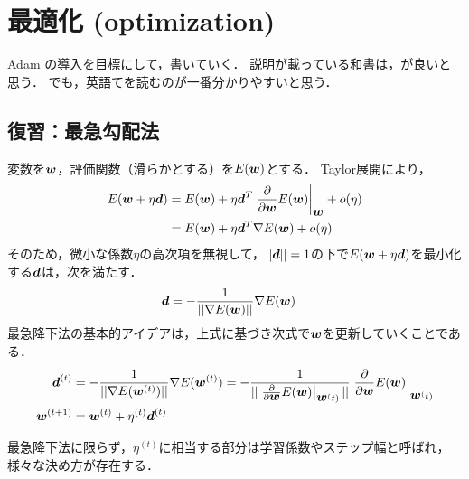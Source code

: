 \section{最適化 (optimization)}
Adam \cite{kingma2015adam}の導入を目標にして，書いていく．
説明が載っている和書は，\cite{harada2017image}が良いと思う．
でも，英語て\cite{ruder2016overview}を読むのが一番分かりやすいと思う．


\subsection{復習：最急勾配法}
変数を$\vw$，評価関数（滑らかとする）を$E(\vw)$とする．
Taylor展開により，
\begin{align*}
 E(\vw+\eta\vd)
 &=
 E(\vw) + \eta\vd^T\left.\frac{\partial}{\partial \vw}E(\vw)\right|_{\vw} + o(\eta)
 \\
 &=
 E(\vw) + \eta\vd^T \nabla E(\vw) + o(\eta)
\end{align*}
そのため，微小な係数$\eta$の高次項を無視して，$||\vd||=1$の下で$E(\vw+\eta\vd)$を最小化する$\vd$は，次を満たす．
\begin{align*}
  \vd &= -\frac{1}{||\nabla E(\vw)||} \nabla E(\vw)
\end{align*}
最急降下法の基本的アイデアは，上式に基づき次式で$\vw$を更新していくことである．
\begin{align*}
  \vd^{(t)} &= -\frac{1}{||\nabla E(\vw^{(t)})||} \nabla E(\vw^{(t)})
  =
  -\frac{1}{||\left.\frac{\partial}{\partial \vw}E(\vw)\right|_{\vw^(t)}||} \left.\frac{\partial}{\partial \vw}E(\vw)\right|_{\vw^(t)}
  \\
  \vw^{(t+1)} &= \vw^{(t)} + \eta^{(t)} \vd^{(t)}
\end{align*}

最急降下法に限らず，$\eta^{(t)}$に相当する部分は学習係数やステップ幅と呼ばれ，様々な決め方が存在する．


